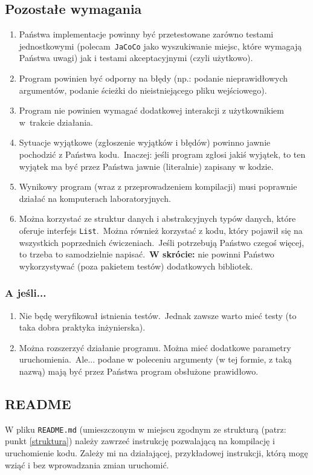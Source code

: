 \documentclass[twoside]{article}
\begin{document}
\subsection{Pozostałe wymagania}
\begin{enumerate}
    \item Państwa implementacje powinny być przetestowane zarówno testami jednostkowymi (polecam\
    \verb|JaCoCo| jako wyszukiwanie miejsc, które wymagają Państwa uwagi) jak i testami akceptacyjnymi (czyli użytkowo).
    \item Program powinien być odporny na błędy (np.: podanie nieprawidłowych argumentów, podanie ścieżki do nieistniejącego pliku wejściowego).
    \item Program nie powinien wymagać dodatkowej interakcji z użytkownikiem w~trakcie działania.
    \item Sytuacje wyjątkowe (zgłoszenie wyjątków i błędów) powinno jawnie pochodzić z Państwa kodu.\
    Inaczej: jeśli program zgłosi jakiś wyjątek, to ten wyjątek ma być przez Państwa jawnie (literalnie) zapisany w kodzie.
    \item Wynikowy program (wraz z przeprowadzeniem kompilacji) musi poprawnie działać na komputerach laboratoryjnych.
    \item Można korzystać ze struktur danych i abstrakcyjnych typów danych, które oferuje interfejs \verb|List|.\
    Można również korzystać z kodu, który pojawił się na wszystkich poprzednich ćwiczeniach.\
    Jeśli potrzebują Państwo czegoś więcej, to trzeba to samodzielnie napisać.\
    \textbf{W skrócie:} nie powinni Państwo wykorzystywać (poza pakietem testów) dodatkowych bibliotek.
\end{enumerate}

\subsubsection{A jeśli...}
\begin{enumerate}
    \item Nie będę weryfikował istnienia testów.\
    Jednak zawsze warto mieć testy (to taka dobra praktyka inżynierska).
    \item Można rozszerzyć działanie programu. Można mieć dodatkowe parametry uruchomienia.\
    Ale... podane w poleceniu argumenty (w tej formie, z taką nazwą) mają być przez Państwa program obsłużone prawidłowo.
\end{enumerate}

\subsection{README}
W pliku \verb|README.md| (umieszczonym w miejscu zgodnym ze strukturą (patrz: punkt \ref{struktura})
należy zawrzeć instrukcję pozwalającą na kompilację i uruchomienie kodu.
Zależy mi na działającej, przykładowej instrukcji, którą mogę wziąć i bez wprowadzania zmian uruchomić.
\end{document}
